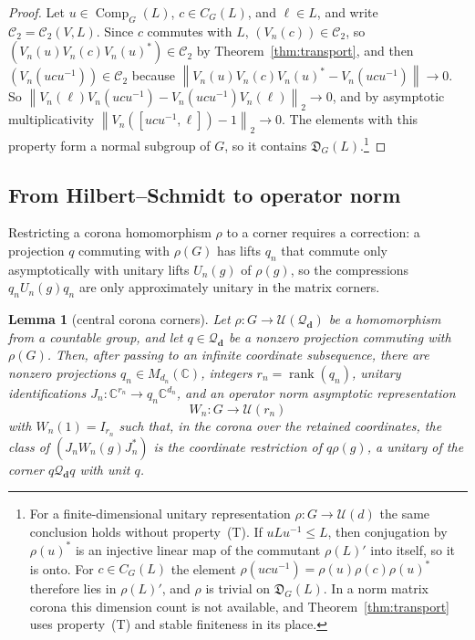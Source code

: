 \documentclass[11pt]{amsart}
\newcommand{\leanverified}[2]{\ignorespaces}
\newtheorem{lemma}[theorem]{Lemma}
\theoremstyle{plain}
\newcommand{\C}{\mathbb C}
\newcommand{\U}{\mathcal U}
\newcommand{\opnorm}[1]{\left\lVert #1\right\rVert}
\newcommand{\hsnorm}[1]{\left\lVert #1\right\rVert_2}
\begin{document}
\begin{proof}
Let $u\in\operatorname{Comp}_G(L)$, $c\in C_G(L)$, and $\ell\in L$, and
write $\mathcal C_2=\mathcal C_2(V,L)$.  Since $c$ commutes with $L$,
$(V_n(c))\in\mathcal C_2$, so $(V_n(u)V_n(c)V_n(u)^*)\in\mathcal C_2$ by
Theorem~\ref{thm:transport}, and then $(V_n(ucu^{-1}))\in\mathcal C_2$
because $\opnorm{V_n(u)V_n(c)V_n(u)^*-V_n(ucu^{-1})}\to0$.  So
$\hsnorm{V_n(\ell)V_n(ucu^{-1})-V_n(ucu^{-1})V_n(\ell)}\to0$, and by
asymptotic multiplicativity $\hsnorm{V_n([ucu^{-1},\ell])-1}\to0$.  The
elements with this property form a normal subgroup of $G$, so it
contains $\mathfrak D_G(L)$.\footnote{For a finite-dimensional unitary
representation $\rho\colon G\to\U(d)$ the same conclusion holds without
property~\textup{(T)}.  If $uLu^{-1}\le L$, then conjugation by
$\rho(u)^*$ is an injective linear map of the commutant $\rho(L)'$ into
itself, so it is onto.  For $c\in C_G(L)$ the element
$\rho(ucu^{-1})=\rho(u)\rho(c)\rho(u)^*$ therefore lies in $\rho(L)'$,
and $\rho$ is trivial on $\mathfrak D_G(L)$.  In a norm matrix corona
this dimension count is not available, and Theorem~\ref{thm:transport}
uses property~\textup{(T)} and stable finiteness in its place.}
\end{proof}

\subsection{From Hilbert--Schmidt to operator norm}

Restricting a corona homomorphism $\rho$ to a corner requires a
correction: a projection $q$ commuting with $\rho(G)$ has lifts $q_n$
that commute only asymptotically with unitary lifts $U_n(g)$ of
$\rho(g)$, so the compressions $q_nU_n(g)q_n$ are only approximately
unitary in the matrix corners.

\begin{lemma}[central corona corners]\label{lem:central-corona-corner}
Let \(\rho\colon G\to\U(\mathcal Q_{\mathbf d})\) be a homomorphism from a
countable group, and let \(q\in\mathcal Q_{\mathbf d}\) be a nonzero
projection commuting with \(\rho(G)\).  Then, after passing to an infinite
coordinate subsequence, there are nonzero projections
\(q_n\in M_{d_n}(\C)\), integers \(r_n=\operatorname{rank}(q_n)\), unitary
identifications \(J_n\colon\C^{r_n}\to q_n\C^{d_n}\), and an operator norm
asymptotic representation
\[
 W_n\colon G\longrightarrow\U(r_n)
\]
with \(W_n(1)=I_{r_n}\) such that, in the corona over the retained
coordinates, the class of \((J_nW_n(g)J_n^*)\) is the coordinate restriction
of \(q\rho(g)\), a unitary of the corner \(q\mathcal Q_{\mathbf d}q\) with
unit \(q\).
\leanverified{Manuscript/OneSidedMFRadical/CentralCoronaCorner}{GroupApproximation.Manuscript.OneSidedMFRadical.manuscriptCentralCoronaCorner}
\end{lemma}
\end{document}
